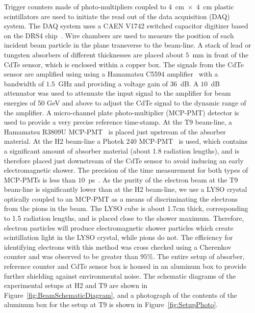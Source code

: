 Trigger counters made of photo-multipliers coupled to $4$~$\mathrm{cm}$~$\times$~$4$~$\mathrm{cm}$ 
plastic scintillators are used 
to initiate the read out of the data acquisition (DAQ) system. The DAQ system
uses a CAEN V1742 switched capacitor digitizer based on the DRS4 chip~\cite{DRS4}. Wire chambers
are used to measure the position of each incident beam particle in the plane transverse
to the beam-line. A stack of lead or tungsten absorbers of different thicknesses are 
placed about $5$~mm in front of the CdTe sensor, which is 
enclosed within a copper box. The signals from the CdTe sensor are amplified using 
using a Hamamatsu C5594 amplifier~\cite{HamaAmpDataSheet} with a bandwidth of
$1.5$~GHz and providing a voltage gain of $36$~dB. A $10$~dB attenuator was used to attenuate the input signal 
to the amplifier for beam energies of 50 GeV and above to adjust the CdTe signal to the dynamic range of the amplifier. 
A micro-channel plate photo-multiplier (MCP-PMT)
detector is used to provide a very precise reference time-stamp. At the T9 beam-line,
a Hamamatsu R3809U MCP-PMT~\cite{HamaMCPDataSheet} is placed just upstream of the absorber material. 
At the H2 beam-line a Photek 240 MCP-PMT~\cite{PhotekDataSheet} is used, which contains a significant 
amount of absorber material (about 1.8 radiation lengths), and is therefore placed 
just downstream of the CdTe sensor to avoid inducing an early electromagnetic shower.
The precision of the time measurement for both types of MCP-PMTs is less than 
$10$~ps~\cite{MCPShowerMaxPaper,Anderson:2015gha}. As the purity of the electron beam at the T9 beam-line is
significantly lower than at the H2 beam-line, we use a LYSO crystal
optically coupled to an MCP-PMT as a means of discriminating the electrons from the pions
in the beam. The LYSO cube is about 1.7cm thick, corresponding to 1.5 radiation lengths, 
and is placed close to the shower maximum. Therefore, electron particles will produce 
electromagnetic shower particles which create scintillation light in the LYSO crystal, 
while pions do not. The efficiency for identifying electrons with this method was 
cross checked using a Cherenkov counter and was observed to be greater than $95\%$.
The entire setup of absorber, reference counter and CdTe sensor box is housed in an aluminum
box to provide further shielding against environmental noise.
The schematic diagrams of the experimental setups at H2 and T9 
are shown in Figure~\ref{fig:BeamSchematicDiagram}, and a photograph
of the contents of the aluminum box for the setup at T9 is shown in 
Figure~\ref{fig:SetupPhoto}.


